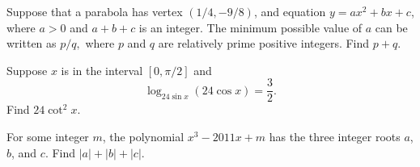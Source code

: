 %	











\begin{question}[name={2011 AIME I, \href{https://artofproblemsolving.com/community/c4p2209689}{Problem 6}}]
	Suppose that a parabola has vertex $\left({1}/{4},-{9}/{8}\right)$, and equation $y=ax^2+bx+c$, where $a>0$ and $a+b+c$ is an integer. The minimum possible value of $a$ can be written as ${p}/{q},$ where $p$ and $q$ are relatively prime positive integers. Find $p+q$.
\end{question}


%	













\begin{question}[name={2011 AIME I, \href{https://artofproblemsolving.com/community/c4p2209695}{Problem 9}}]
	Suppose $x$ is in the interval $[0,\pi/2]$ and $$\log_{24\sin{x}}(24\cos{x})=\frac{3}{2}.$$
	Find $24\cot^2{x}$.
\end{question}


%	








\begin{question}[name={2011 AIME I, \href{https://artofproblemsolving.com/community/c4p2209754}{Problem 15}}]
	For some integer $m$, the polynomial $x^3-2011x+m$ has the three integer roots $a$, $b$, and $c$. Find $|a|+|b|+|c|$.
\end{question}


%	












